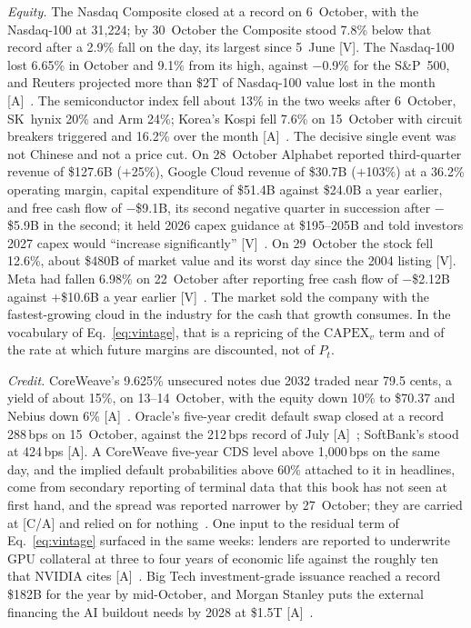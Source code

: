 \emph{Equity.} The Nasdaq Composite closed at a record on 6~October, with the Nasdaq-100 at 31,224; by 30~October the Composite stood 7.8\% below that record after a 2.9\% fall on the day, its largest since 5~June [V]. The Nasdaq-100 lost 6.65\% in October and 9.1\% from its high, against $-$0.9\% for the S\&P~500, and Reuters projected more than \$2T of Nasdaq-100 value lost in the month [A]~\cite{cap-nasdaq-oct}. The semiconductor index fell about 13\% in the two weeks after 6~October, SK~hynix 20\% and Arm 24\%; Korea's Kospi fell 7.6\% on 15~October with circuit breakers triggered and 16.2\% over the month [A]~\cite{cap-nasdaq-oct}. The decisive single event was not Chinese and not a price cut. On 28~October Alphabet reported third-quarter revenue of \$127.6B ($+$25\%), Google Cloud revenue of \$30.7B ($+$103\%) at a 36.2\% operating margin, capital expenditure of \$51.4B against \$24.0B a year earlier, and free cash flow of $-$\$9.1B, its second negative quarter in succession after $-$\$5.9B in the second; it held 2026 capex guidance at \$195--205B and told investors 2027 capex would ``increase significantly'' [V]~\cite{cap-alphabet-q3}. On 29~October the stock fell 12.6\%, about \$480B of market value and its worst day since the 2004 listing [V]. Meta had fallen 6.98\% on 22~October after reporting free cash flow of $-$\$2.12B against $+$\$10.6B a year earlier [V]~\cite{cap-meta-q3}. The market sold the company with the fastest-growing cloud in the industry for the cash that growth consumes. In the vocabulary of Eq.~\eqref{eq:vintage}, that is a repricing of the $\mathrm{CAPEX}_v$ term and of the rate at which future margins are discounted, not of $P_t$.

\emph{Credit.} CoreWeave's 9.625\% unsecured notes due 2032 traded near 79.5 cents, a yield of about 15\%, on 13--14~October, with the equity down 10\% to \$70.37 and Nebius down 6\% [A]~\cite{cap-coreweave-oct}. Oracle's five-year credit default swap closed at a record 288\,bps on 15~October, against the 212\,bps record of July [A]~\cite{cap-oracle-cds-oct,oracle-cds}; SoftBank's stood at 424\,bps [A]. A CoreWeave five-year CDS level above 1,000\,bps on the same day, and the implied default probabilities above 60\% attached to it in headlines, come from secondary reporting of terminal data that this book has not seen at first hand, and the spread was reported narrower by 27~October; they are carried at [C/A] and relied on for nothing~\cite{cap-oracle-cds-oct}. One input to the residual term of Eq.~\eqref{eq:vintage} surfaced in the same weeks: lenders are reported to underwrite GPU collateral at three to four years of economic life against the roughly ten that NVIDIA cites [A]~\cite{cap-coreweave-oct}. Big Tech investment-grade issuance reached a record \$182B for the year by mid-October, and Morgan Stanley puts the external financing the AI buildout needs by 2028 at \$1.5T [A]~\cite{cap-nasdaq-oct}.

